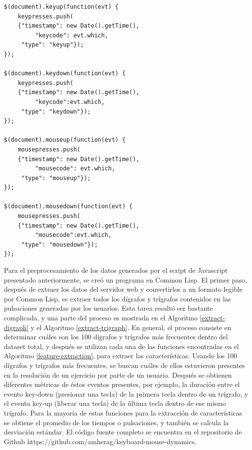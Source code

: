 
\begin{lstlisting}[label=dinamica,frame=single]
$(document).keyup(function(evt) {
    keypresses.push(
	{"timestamp": new Date().getTime(),
         "keycode": evt.which,
	 "type": "keyup"});
});

$(document).keydown(function(evt) {
    keypresses.push(
	{"timestamp": new Date().getTime(),
         "keycode":evt.which,
	 "type": "keydown"});
});

$(document).mouseup(function(evt) {
    mousepresses.push(
	{"timestamp": new Date().getTime(),
         "mousecode": evt.which,
	 "type": "mouseup"});
});

$(document).mousedown(function(evt) {
    mousepresses.push(
	{"timestamp": new Date().getTime(),
         "mousecode":evt.which,
	 "type": "mousedown"});
});
\end{lstlisting}

Para el preprocesamiento de los datos generados por el script de
Javascript presentado anteriormente, se creó un programa en Common
Lisp. El primer paso, después de extraer los datos del servidor web y
convertirlos a un formato legible por Common Lisp, es extraer todos
los dígrafos y trígrafos contenidos en las pulsaciones generadas por
los usuarios. Esta tarea resultó ser bastante complicada, y una parte
del proceso es mostrada en el Algoritmo \ref{extract-digraph} y el Algoritmo
\ref{extract-trigraph}. En general, el proceso consiste en determinar
cuáles son los 100 dígrafos y trígrafos más frecuentes dentro del
dataset total, y después se utilizan cada una de las funciones
encontradas en el Algoritmo \ref{feature-extraction}, para extraer las
características. Usando los 100 dígrafos y trígrafos más frecuentes,
se buscan cuáles de ellos estuvieron presentes en la resolución de un
ejercicio por parte de un usuario. Después se obtienen diferentes
métricas de éstos eventos presentes, por ejemplo, la duración entre el
evento key-down (presionar una tecla) de la primera tecla dentro de un
trígrafo, y el evento key-up (liberar una tecla) de la última tecla
dentro de ese mismo trígrafo. Para la mayoría de estas funciones para la
extracción de características se obtiene el promedio de los tiempos o
pulsaciones, y también se calcula la desviación estándar. El código
fuente completo se encuentra en el repositorio de Github
https://github.com/amherag/keyboard-mouse-dynamics.

